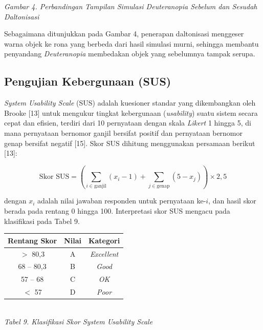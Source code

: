 \begin{center}
  {\footnotesize\textit{Gambar 4. Perbandingan Tampilan Simulasi Deuteranopia Sebelum dan Sesudah Daltonisasi}}
\end{center}

Sebagaimana ditunjukkan pada Gambar 4, penerapan daltonisasi menggeser warna objek ke rona yang berbeda dari hasil simulasi murni, sehingga membantu penyandang \textit{Deuteranopia} membedakan objek yang sebelumnya tampak serupa.

\subsection{Pengujian Kebergunaan (SUS)}

\textit{System Usability Scale} (SUS) adalah kuesioner standar yang dikembangkan oleh Brooke [13] untuk mengukur tingkat kebergunaan (\textit{usability}) suatu sistem secara cepat dan efisien, terdiri dari 10 pernyataan dengan skala \textit{Likert} 1 hingga 5, di mana pernyataan bernomor ganjil bersifat positif dan pernyataan bernomor genap bersifat negatif [15]. Skor SUS dihitung menggunakan persamaan berikut [13]:

\begin{equation}
\text{Skor SUS} = \left(\sum_{i \in \text{ganjil}}(x_i - 1) + \sum_{j \in \text{genap}}(5 - x_j)\right) \times 2{,}5
\end{equation}

dengan $x_i$ adalah nilai jawaban responden untuk pernyataan ke-$i$, dan hasil skor berada pada rentang 0 hingga 100. Interpretasi skor SUS mengacu pada klasifikasi pada Tabel 9.

\begin{table}[H]
  \centering
  {\footnotesize
  \begin{tabular}{|c|c|c|}
    \hline
    \textbf{Rentang Skor} & \textbf{Nilai} & \textbf{Kategori} \\
    \hline
    $>$ 80,3 & A & \textit{Excellent} \\ \hline
    68 -- 80,3 & B & \textit{Good} \\ \hline
    57 -- 68 & C & \textit{OK} \\ \hline
    $<$ 57 & D & \textit{Poor} \\ \hline
  \end{tabular}}\\[0.3em]
  {\footnotesize\textit{Tabel 9. Klasifikasi Skor System Usability Scale}}
\end{table}

